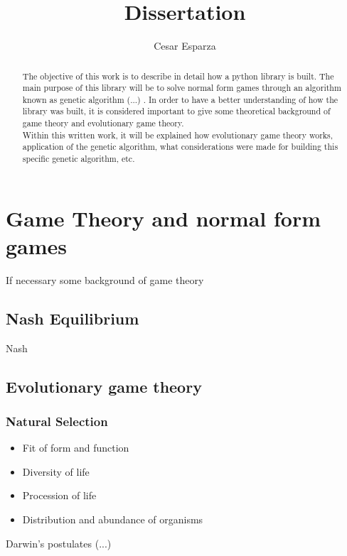 \documentclass{article}
\title{Dissertation}
\author{Cesar Esparza}
\begin{document}
 
\maketitle
\begin{abstract}
The objective of this work is to describe in detail how a python library is built. The main purpose of this library will be to solve normal form games through an algorithm known as genetic algorithm (...) . In order to have a better understanding of how the library was built, it is considered important to give some theoretical background of game theory and evolutionary game theory.  
\\Within this written work, it will be explained how evolutionary game theory works, application of the genetic algorithm, what considerations were made for building this specific genetic algorithm, etc.

\end{abstract}


\newpage
\section{Game Theory and normal form games}\label{first_section}

If necessary some background of game theory

\subsection{Nash Equilibrium}\label{second_section}

Nash

\subsection{Evolutionary game theory}
\subsubsection{Natural Selection}

\begin{itemize}
	\item Fit of form and function
	\item Diversity of life
	\item Procession of life
	\item Distribution and abundance of organisms
\end{itemize}
Darwin's postulates (...)
\end{document}
